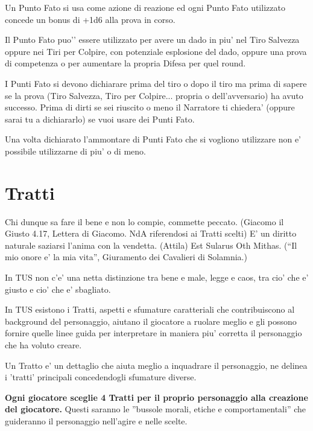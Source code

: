 \documentclass[a4paper,11pt,twoside,openany]{dndbook}
\begin{document}
Un Punto Fato si usa come azione di reazione ed ogni Punto Fato utilizzato concede un bonus di +1d6 alla prova in corso. 

Il Punto Fato puo'’ essere utilizzato per avere un dado in piu' nel Tiro Salvezza oppure nei Tiri per Colpire, con potenziale esplosione del dado, oppure una prova di competenza o per aumentare la propria Difesa per quel round.

I Punti Fato si devono dichiarare prima del tiro o dopo il tiro ma prima di sapere se la prova (Tiro Salvezza, Tiro per Colpire... propria o dell’avversario) ha avuto successo. 
Prima di dirti se sei riuscito o meno il Narratore ti chiedera’ (oppure sarai tu a dichiararlo) se vuoi usare dei Punti Fato.

Una volta dichiarato l’ammontare di Punti Fato che si vogliono utilizzare non e’ possibile utilizzarne di piu' o di meno.

\section{Tratti}

\label{tratti}
\begin{quotebox}
Chi dunque sa fare il bene e non lo compie, commette peccato. (Giacomo il Giusto 4.17, Lettera di Giacomo. NdA riferendosi ai Tratti scelti)\linebreak\linebreak
E' un diritto naturale saziarsi l'anima con la vendetta. (Attila)\linebreak\linebreak
Est Sularus Oth Mithas. (“Il mio onore e' la mia vita”, Giuramento dei Cavalieri di Solamnia.)\end{quotebox}

In TUS non c'e' una netta distinzione tra bene e male, legge e caos, tra cio' che e' giusto e cio' che e' sbagliato.

In TUS esistono i Tratti, aspetti e sfumature caratteriali che contribuiscono al background del personaggio, aiutano il giocatore a ruolare meglio e gli possono fornire quelle linee guida per interpretare in maniera piu' corretta il personaggio che ha voluto creare.

Un Tratto e' un dettaglio che aiuta meglio a inquadrare il personaggio, ne delinea i 'tratti' principali concedendogli sfumature diverse.

\textbf{Ogni giocatore sceglie 4 Tratti per il proprio personaggio alla creazione del giocatore.} Questi saranno le ''bussole morali, etiche e comportamentali'' che guideranno il personaggio nell'agire e nelle scelte.
\end{document}
